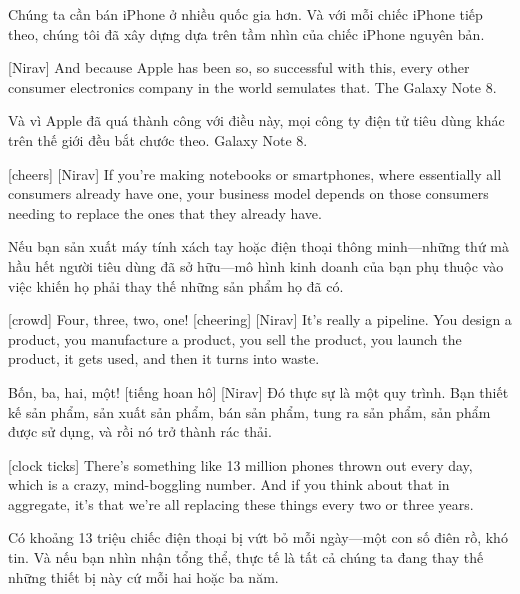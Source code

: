 \documentclass[a4paper]{article}
\begin{document}
	\begin{vietnamese-v2}
		Chúng ta cần bán iPhone ở nhiều quốc gia hơn. Và với mỗi chiếc iPhone tiếp theo, chúng tôi đã xây dựng dựa trên tầm nhìn của chiếc iPhone nguyên bản.
	\end{vietnamese-v2}
	
	[Nirav] And because Apple has been so, so successful with this, every other consumer electronics company in the world semulates that.
	The Galaxy Note 8.
	
	\begin{vietnamese-v2}
		[Nirav] Và vì Apple đã quá thành công với điều này, mọi công ty điện tử tiêu dùng khác trên thế giới đều bắt chước theo.  
		Galaxy Note 8.
	\end{vietnamese-v2}
	
	
	[cheers]
	[Nirav] If you're making notebooks or smartphones, where essentially all consumers already have one, your business model depends on those consumers needing to replace the ones that they already have.
	
	\begin{vietnamese-v2}
		 Nếu bạn sản xuất máy tính xách tay hoặc điện thoại thông minh—những thứ mà hầu hết người tiêu dùng đã sở hữu—mô hình kinh doanh của bạn phụ thuộc vào việc khiến họ phải thay thế những sản phẩm họ đã có.
	\end{vietnamese-v2}
	
	[crowd] Four, three, two, one!
	[cheering]
	[Nirav] It's really a pipeline. You design a product, you manufacture a product, you sell the product, you launch the product, it gets used, and then it turns into waste.
	
	\begin{vietnamese-v2}
		 Bốn, ba, hai, một! [tiếng hoan hô] [Nirav] Đó thực sự là một quy trình. Bạn thiết kế sản phẩm, sản xuất sản phẩm, bán sản phẩm, tung ra sản phẩm, sản phẩm được sử dụng, và rồi nó trở thành rác thải.
	\end{vietnamese-v2}
	
	[clock ticks]
	There's something like 13 million phones thrown out every day, which is a crazy, mind-boggling number. And if you think about that in aggregate, it's that we're all replacing these things every two or three years.
	
	\begin{vietnamese-v2}
		 Có khoảng 13 triệu chiếc điện thoại bị vứt bỏ mỗi ngày—một con số điên rồ, khó tin. Và nếu bạn nhìn nhận tổng thể, thực tế là tất cả chúng ta đang thay thế những thiết bị này cứ mỗi hai hoặc ba năm.
	\end{vietnamese-v2}
	
\end{document}
